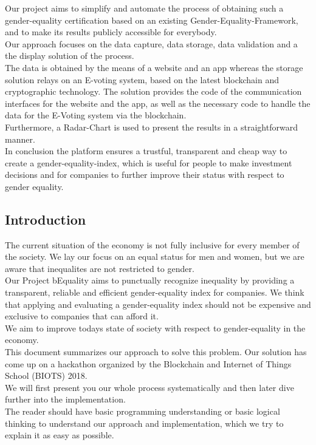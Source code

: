 \documentclass[portrait,a4paper]{article}
\begin{document}
	Our project aims to simplify and automate the process of obtaining such a gender-equality certification 
	based on an existing Gender-Equality-Framework, and to make its results publicly accessible for everybody.\\
	Our approach focuses on the data capture, data storage, data validation and a the display solution of the process.\\
	The data is obtained by the means of a website and an app whereas the storage solution relays on an 
	E-voting system, based on the latest blockchain and cryptographic technology. The solution provides 
	the code of the communication interfaces for the website and the app, as well as the necessary code 
	to handle the data for the E-Voting system via the blockchain.\\
	Furthermore, a Radar-Chart is used to present the results in a straightforward manner.\\

	In conclusion the platform ensures a trustful, transparent and cheap way to create a gender-equality-index, 
	which is useful for people to make investment decisions and for companies to further improve their status 
	with respect to gender equality.
	
	\subsection*{Introduction}
		The current situation of the economy is not fully inclusive for every member of the society. We lay our focus on an equal status for men and women, but we are aware that inequalites are not restricted to gender.\\
		Our Project bEquality aims to punctually recognize inequality by providing a transparent, 
		reliable and efficient gender-equality index for companies. We think that applying and 
		evaluating a gender-equality index should not be expensive and exclusive to companies 
		that can afford it.\\
		We aim to improve todays state of society with respect to gender-equality in the economy.\\

		This document summarizes our approach to solve this problem. Our solution has come up on a hackathon 
		organized by the Blockchain and Internet of Things School (BIOTS) 2018.\\

		We will first present you our whole process systematically and then later dive further into the 
		implementation.\\
		The reader should have basic programming understanding or basic logical thinking to understand 
		our approach and implementation, which we try to explain it as easy as possible.
\end{document}
